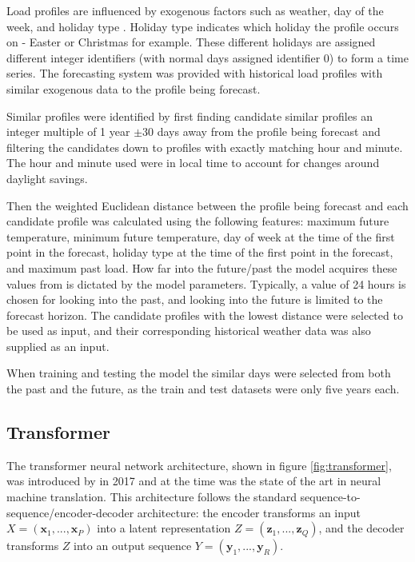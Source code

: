 \documentclass[conference]{IEEEtran}
\begin{document}
Load profiles are influenced by exogenous factors such as weather, day of the week, and holiday type \cite{Weron2006}.
Holiday type indicates which holiday the profile occurs on - Easter or Christmas for example.
These different holidays are assigned different integer identifiers (with normal days assigned identifier 0) to form a time series.
The forecasting system was provided with historical load profiles with similar exogenous data to the profile being forecast.
\par
Similar profiles were identified by first finding candidate similar profiles an integer multiple of 1 year $\pm$30 days away from the profile being forecast and filtering the candidates down to profiles with exactly matching hour and minute.
The hour and minute used were in local time to account for changes around daylight savings.

Then the weighted Euclidean distance between the profile being forecast and each candidate profile was calculated using the following features: maximum future temperature, minimum future temperature, day of week at the time of the first point in the forecast, holiday type at the time of the first point in the forecast, and maximum past load.
How far into the future/past the model acquires these values from is dictated by the model parameters.
Typically, a value of 24 hours is chosen for looking into the past, and looking into the future is limited to the forecast horizon.
The candidate profiles with the lowest distance were selected to be used as input, and their corresponding historical weather data was also supplied as an input.
\par
When training and testing the model the similar days were selected from both the past and the future, as the train and test datasets were only five years each.
\subsection{Transformer}
The transformer neural network architecture, shown in figure \ref{fig:transformer}, was introduced by \cite{Vaswani2017} in 2017 and at the time was the state of the art in neural machine translation.
This architecture follows the standard sequence-to-sequence/encoder-decoder architecture: the encoder transforms an input $X = (\boldsymbol{x}_1, ..., \boldsymbol{x}_P)$ into a latent representation $Z = (\boldsymbol{z}_1, ..., \boldsymbol{z}_Q)$, and the decoder transforms $Z$ into an output sequence $Y = (\boldsymbol{y}_1, ..., \boldsymbol{y}_R)$.
\end{document}
